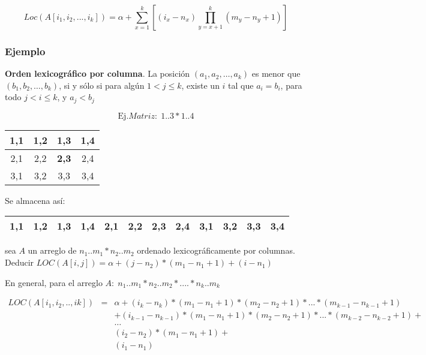 \[
Loc (A[i_1, i_2, ... ,i_k])= \alpha + \sum_{x=1}^k \left[(i_x-n_x) \prod_{y=x+1}^k\left(m_y-n_y+1\right)\right]
\]

\subsubsection{Ejemplo}
\label{sec:ejemplo}

\begin{definicion}
  \textbf{Orden lexicográfico por columna}. La posición $(a_1, a_2 ,
  \ldots , a_k)$ es menor que $(b_1, b_2, \ldots , b_k)$, si y sólo si
  para algún $1 < j \leq k$, existe un $i$ tal que $a_i = b_i$, para
  todo $j < i \leq k$, y $a_j < b_j$
\end{definicion}

$$\text{Ej.} Matriz:\; 1..3 * 1..4$$
\begin{center}
  \begin{tabular}{|c|c|c|c|}
    \hline
    1,1 & 1,2 & 1,3 & 1,4\\ \hline
    2,1 & 2,2 &	\textbf{2,3} & 2,4\\ \hline
    3,1 & 3,2 &	3,3 & 3,4\\ \hline
  \end{tabular}
\end{center}

Se almacena así:
\begin{center}
  \begin{tabular}{|c|c|c|c|c|c|c|c|c|c|c|c|}
    \hline
    1,1&1,2&1,3&1,4&2,1&2,2&\textbf{2,3}&2,4&3,1&3,2&3,3&3,4\\ \hline
  \end{tabular}
\end{center}

sea $A$ un arreglo de $n_1..m_1 * n_2..m_2$ ordenado
lexicográficamente por columnas. Deducir $LOC \left( A[i,j] \right) =
\alpha + (j-n_2) * (m_1-n_1+1) + (i-n_1)$

En general, para el arreglo $A:\; n_1..m_1 * n_2..m_2 * .... * n_k..m_k$

\begin{eqnarray*}
  LOC \left( A[i_1, i_2, .., ik] \right) &=& \alpha + (i_k - n_k)* (m_1 - n_1 +1) * (m_2 - n_2 + 1) * ...* (m_{k-1} - n_{k-1}  +1 )\\
  & & + (i_{k-1} - n_{k-1} ) * (m_1 - n_1 +1) * (m_2 - n_2 + 1) * ...* (m_{k-2} - n_{k-2}  +1 ) + \\
  & &  \ldots \\
  & &  (i_2 - n_2 ) * (m_1 - n_1 +1)  + \\
  & & (i_1 - n_1 )
\end{eqnarray*}




